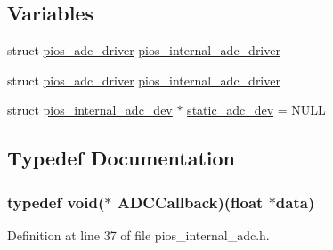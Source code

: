 \subsection*{\-Variables}
\begin{DoxyCompactItemize}
\item 
struct \hyperlink{structpios__adc__driver}{pios\-\_\-adc\-\_\-driver} \hyperlink{group___p_i_o_s___i_n_t_e_r_n_a_l___a_d_c_gaa1decc30319efc11cab3d3e9ba32ff8e}{pios\-\_\-internal\-\_\-adc\-\_\-driver}
\item 
struct \hyperlink{structpios__adc__driver}{pios\-\_\-adc\-\_\-driver} \hyperlink{group___p_i_o_s___i_n_t_e_r_n_a_l___a_d_c_gaa1decc30319efc11cab3d3e9ba32ff8e}{pios\-\_\-internal\-\_\-adc\-\_\-driver}
\item 
struct \hyperlink{structpios__internal__adc__dev}{pios\-\_\-internal\-\_\-adc\-\_\-dev} $\ast$ \hyperlink{group___p_i_o_s___i_n_t_e_r_n_a_l___a_d_c_ga98f54a9670626234febef25763cd6660}{static\-\_\-adc\-\_\-dev} = \-N\-U\-L\-L
\end{DoxyCompactItemize}


\subsection{\-Typedef \-Documentation}
\hypertarget{group___p_i_o_s___i_n_t_e_r_n_a_l___a_d_c_ga20bf90833813c2c4945fab90c8e4f386}{
\subsubsection[{\-A\-D\-C\-Callback}]{\setlength{\rightskip}{0pt plus 5cm}typedef void($\ast$ {\bf \-A\-D\-C\-Callback})(float $\ast$data)}}\label{group___p_i_o_s___i_n_t_e_r_n_a_l___a_d_c_ga20bf90833813c2c4945fab90c8e4f386}


\-Definition at line 37 of file pios\-\_\-internal\-\_\-adc.\-h.



